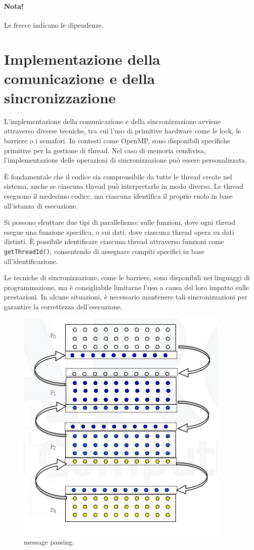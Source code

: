 \paragraph{\color{red}Nota!}Le frecce indicano le dipendenze.

\section{Implementazione della comunicazione e della sincronizzazione}

L'implementazione della comunicazione e della sincronizzazione avviene attraverso diverse tecniche, tra cui l'uso di primitive hardware come le lock, le barriere o i semafori. In contesti come OpenMP, sono disponibili specifiche primitive per la gestione di thread. Nel caso di memoria condivisa, l'implementazione delle operazioni di sincronizzazione può essere personalizzata.

È fondamentale che il codice sia comprensibile da tutte le thread create nel sistema, anche se ciascuna thread può interpretarlo in modo diverso. Le thread eseguono il medesimo codice, ma ciascuna identifica il proprio ruolo in base all'istanza di esecuzione.

Si possono sfruttare due tipi di parallelismo: sulle funzioni, dove ogni thread esegue una funzione specifica, o sui dati, dove ciascuna thread opera su dati distinti. È possibile identificare ciascuna thread attraverso funzioni come \texttt{getThreadId()}, consentendo di assegnare compiti specifici in base all'identificazione.

Le tecniche di sincronizzazione, come le barriere, sono disponibili nei linguaggi di programmazione, ma è consigliabile limitarne l'uso a causa del loro impatto sulle prestazioni. In alcune situazioni, è necessario mantenere tali sincronizzazioni per garantire la correttezza dell'esecuzione.
\begin{figure}[th]
	\centering
	\includegraphics[width=0.7\linewidth]{img/message-passing}
	\caption{message passing.}
	\label{fig:message-passing}
\end{figure}

